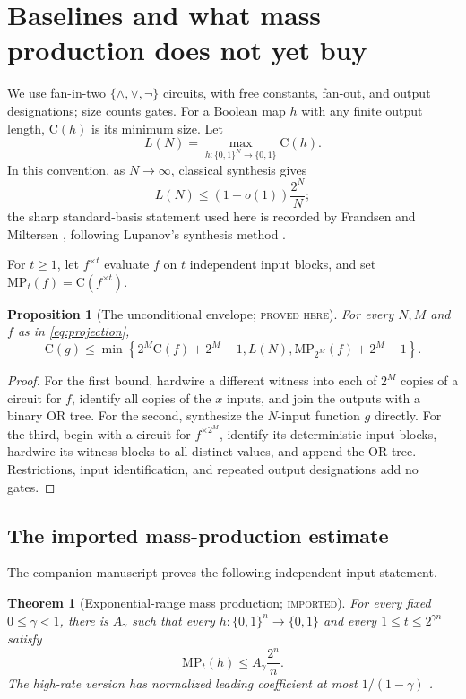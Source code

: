 \documentclass[11pt]{article}
\newtheorem{theorem}{Theorem}[section]
\newtheorem{proposition}[proposition]{Proposition}
\theoremstyle{definition}
\theoremstyle{remark}
\newcommand{\bits}{\{0,1\}}
\newcommand{\C}{\mathrm C}
\newcommand{\MP}{\mathrm{MP}}
\newcommand{\status}[1]{\textsc{#1}}
\begin{document}
\section{Baselines and what mass production does not yet buy}
\label{sec:baselines}

We use fan-in-two $\{\wedge,\vee,\neg\}$ circuits, with free constants,
fan-out, and output designations; size counts gates.  For a Boolean map $h$
with any finite output length, $\C(h)$ is its minimum size.  Let
\[
  L(N)=\max_{h:\bits^N\to\bits}\C(h).
\]
In this convention, as $N\to\infty$, classical synthesis gives
\[
  L(N)\le (1+o(1))\frac{2^N}{N};
  \tag{2.1}\label{eq:lupanov}
\]
the sharp standard-basis statement used here is recorded by Frandsen and
Miltersen \cite{FrandsenMiltersen2005}, following Lupanov's synthesis method
\cite{Lupanov1958}.

For $t\ge1$, let $f^{\times t}$ evaluate $f$ on $t$ independent input blocks,
and set $\MP_t(f)=\C(f^{\times t})$.

\begin{proposition}[The unconditional envelope; \status{proved here}]
\label{prop:envelope}
For every $N,M$ and $f$ as in \eqref{eq:projection},
\[
  \C(g)\le
  \min\left\{
    2^M\C(f)+2^M-1,
    L(N),
    \MP_{2^M}(f)+2^M-1
  \right\}.
  \tag{2.2}\label{eq:envelope}
\]
\end{proposition}

\begin{proof}
For the first bound, hardwire a different witness into each of $2^M$ copies
of a circuit for $f$, identify all copies of the $x$ inputs, and join the
outputs with a binary OR tree.  For the second, synthesize the $N$-input
function $g$ directly.  For the third, begin with a circuit for
$f^{\times 2^M}$, identify its deterministic input blocks, hardwire its
witness blocks to all distinct values, and append the OR tree.  Restrictions,
input identification, and repeated output designations add no gates.
\end{proof}

\subsection{The imported mass-production estimate}

The companion manuscript proves the following independent-input statement.

\begin{theorem}[Exponential-range mass production; \status{imported}]
\label{thm:imported-mp}
For every fixed $0\le\gamma<1$, there is $A_\gamma$ such that every
$h:\bits^n\to\bits$ and every $1\le t\le2^{\gamma n}$ satisfy
\[
  \MP_t(h)\le A_\gamma\frac{2^n}{n}.
  \tag{2.3}\label{eq:imported-mp}
\]
The high-rate version has normalized leading coefficient at most
$1/(1-\gamma)$ \cite{Schlesinger2026}.
\end{theorem}
\end{document}
